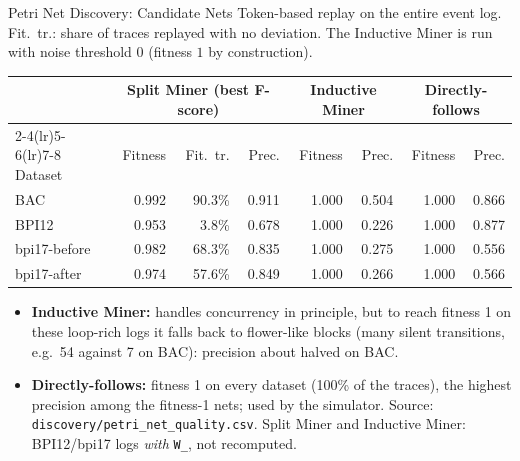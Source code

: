 \documentclass[aspectratio=169]{beamer} %
\begin{document}
\begin{frame}{Petri Net Discovery: Candidate Nets}
  \small
  Token-based replay on the entire event log. Fit.\ tr.: share of traces replayed with no
  deviation. The Inductive Miner is run with noise threshold $0$ (fitness $1$ by construction).
  \begin{center}\setlength{\tabcolsep}{4pt}
  \begin{tabular}{l rrr rr rr}
    \toprule
     & \multicolumn{3}{c}{Split Miner (best F-score)} & \multicolumn{2}{c}{Inductive Miner}
     & \multicolumn{2}{c}{\alert{Directly-follows}} \\
    \cmidrule(lr){2-4}\cmidrule(lr){5-6}\cmidrule(lr){7-8}
    Dataset & Fitness & Fit.\ tr. & Prec. & Fitness & Prec. & Fitness & Prec. \\
    \midrule
    BAC          & 0.992 & 90.3\% & 0.911 & 1.000 & 0.504 & 1.000 & 0.866 \\
    BPI12        & 0.953 &  3.8\% & 0.678 & 1.000 & 0.226 & 1.000 & 0.877 \\
    bpi17-before & 0.982 & 68.3\% & 0.835 & 1.000 & 0.275 & 1.000 & 0.556 \\
    bpi17-after  & 0.974 & 57.6\% & 0.849 & 1.000 & 0.266 & 1.000 & 0.566 \\
    \bottomrule
  \end{tabular}
  \end{center}
  \scriptsize
  \begin{itemize}
    \item \textbf{Inductive Miner:} handles concurrency in principle, but to reach fitness 1 on
      these loop-rich logs it falls back to flower-like blocks (many silent transitions, e.g.\
      54 against 7 on BAC): \alert{precision about halved} on BAC.
    \item \textbf{Directly-follows:} fitness 1 on every dataset (100\% of the traces), the
      highest precision among the fitness-1 nets; used by the simulator.
      Source: \texttt{discovery/petri\_net\_quality.csv}. Split Miner and Inductive Miner: BPI12/bpi17 logs \emph{with} \texttt{W\_}, not recomputed.
  \end{itemize}
\end{frame}
\end{document}
